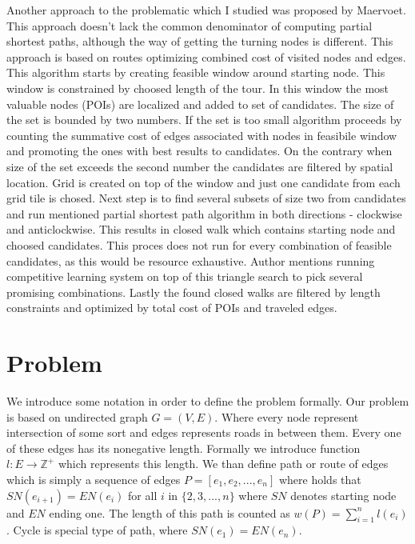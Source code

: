 \documentclass{ctuthesis}
\begin{document}
Another approach to the problematic which I studied was proposed by Maervoet\cite{oatsp}. This approach doesn't lack the common denominator of computing partial shortest paths, although the way of getting the turning nodes is different. This approach is based on routes optimizing combined cost of visited nodes and edges. This algorithm starts by creating feasible window around starting node. This window is constrained by choosed length of the tour. In this window the most valuable nodes (POIs) are localized and added to set of candidates. The size of the set is bounded by two numbers. If the set is too small algorithm proceeds by counting the summative cost of edges associated with nodes in feasibile window and promoting the ones with best results to candidates. On the contrary when size of the set exceeds the second number the candidates are filtered by spatial location. Grid is created on top of the window and just one candidate from each grid tile is chosed. Next step is to find several subsets of size two from candidates and run mentioned partial shortest path algorithm in both directions - clockwise and anticlockwise. This results in closed walk which contains starting node and choosed candidates. This proces does not run for every combination of feasible candidates, as this would be resource exhaustive. Author mentions running competitive learning system on top of this triangle search to pick several promising combinations. Lastly the found closed walks are filtered by length constraints and optimized by total cost of POIs and traveled edges.



\chapter{Problem}
We introduce some notation in order to define the problem formally. Our problem is based on undirected graph \(G=(V, E)\). Where every node represent intersection of some sort and edges represents roads in between them. Every one of these edges has its nonegative length. Formally we introduce function \(l:E \rightarrow \mathbb{Z^+}\) which represents this length. We than define path or route of edges which is simply a sequence of edges \(P = [e_1, e_2, ..., e_n]\) where holds that \(SN(e_{i+1}) = EN(e_i) \) for all \(i\) in \(\{2, 3, ..., n\}\) where \(SN\) denotes starting node and \(EN\) ending one. The length of this path is counted as \(w(P)=\sum_{i=1}^{n}{l(e_i)}\). Cycle is special type of path, where \(SN(e_1) = EN(e_n)\).
\end{document}
